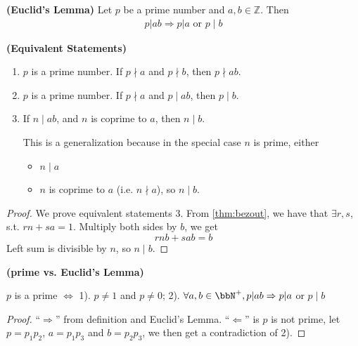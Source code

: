 \documentclass{article}
\newcommand{\bfs}[1]{\textbf{({#1}) }}
\begin{document}
\begin{thma}{\bfs{Euclid’s Lemma}}
 Let $p$ be a prime number and $a, b \in \mathbb{Z} .$ Then
\begin{align*}
p|a b \Rightarrow p| a \text { or } p \mid b
\end{align*}
\end{thma}
\begin{rema}{\bfs{Equivalent Statements}}
\begin{enumerate}
    \item $p$ is a prime number. If $p \nmid a$ and $p \nmid b$, then $p \nmid a b$.
    \item $p$ is a prime number. If $p\nmid a$ and $p \mid a b$, then $p \mid b$. 
    \item If $n \mid a b$, and $n$ is coprime to $a$, then $n \mid b$.
    
    This is a generalization because in the special case $n$ is prime, either
    \begin{itemize}
        \item $n \mid a$ 
        \item $n$ is coprime to $a$ (i.e. $n \nmid a$), so $n \mid b$.
    \end{itemize}
\end{enumerate}
\end{rema}
\begin{proof} We prove equivalent statements 3. 
From \cref{thm:bezout}, we have that $\exists r, s$, s.t.
$r n+s a=1$. Multiply both sides by $b$, we get 
$$r n b+s a b=b$$
Left sum is divisible by $n$, so $n\mid b$.
\end{proof}
\begin{cora}\bfs{prime vs. Euclid’s Lemma}\label{cor:vdfcca}

\centerline{$p$ is a prime $\Longleftrightarrow$ 1). $p \ne 1 $ and $p \neq 0$; 2). $\forall a, b \in \bbN^{+}, p|a b \Rightarrow p| a$ or $p \mid b$}
\end{cora}
\begin{proof}
``$\Rightarrow$'' from definition and Euclid’s Lemma. ``$\Leftarrow$'' is $p$ is not prime, let $p=p_1p_2$, $a=p_1p_3$ and $b=p_2p_3$, we then get a contradiction of 2). 
\end{proof}
\end{document}
